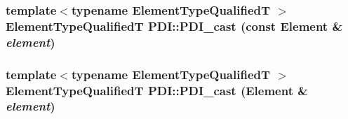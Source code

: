 \hypertarget{namespace_p_d_i_b579ac392aa69d9abfae65846e42f4e0}{
\subsubsection[{PDI\_\-cast}]{\setlength{\rightskip}{0pt plus 5cm}template$<$typename ElementTypeQualifiedT $>$ ElementTypeQualifiedT PDI::PDI\_\-cast (const Element \& {\em element})}}
\label{namespace_p_d_i_b579ac392aa69d9abfae65846e42f4e0}


\hypertarget{namespace_p_d_i_91e7acfd6c982ef09cc58d6acbfe5cbe}{
\subsubsection[{PDI\_\-cast}]{\setlength{\rightskip}{0pt plus 5cm}template$<$typename ElementTypeQualifiedT $>$ ElementTypeQualifiedT PDI::PDI\_\-cast (Element \& {\em element})}}
\label{namespace_p_d_i_91e7acfd6c982ef09cc58d6acbfe5cbe}



